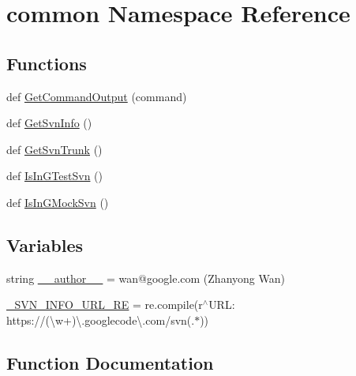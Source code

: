 \hypertarget{namespacecommon}{}\section{common Namespace Reference}
\label{namespacecommon}
\subsection*{Functions}
\begin{DoxyCompactItemize}
\item 
def \hyperlink{namespacecommon_ac1337758ae23f6a91b44de07408791da}{Get\+Command\+Output} (command)
\item 
def \hyperlink{namespacecommon_a312d07161b76d965fee6a61e464e283f}{Get\+Svn\+Info} ()
\item 
def \hyperlink{namespacecommon_a9e6483972a8dc0a6a274cbcee69564b0}{Get\+Svn\+Trunk} ()
\item 
def \hyperlink{namespacecommon_af29dcab2d7b4a9dd846446a0987ab387}{Is\+In\+G\+Test\+Svn} ()
\item 
def \hyperlink{namespacecommon_a8219bb529336fc3f0ef8222a5ed48222}{Is\+In\+G\+Mock\+Svn} ()
\end{DoxyCompactItemize}
\subsection*{Variables}
\begin{DoxyCompactItemize}
\item 
string \hyperlink{namespacecommon_ac0f2c8f2583f0817f09a3e0c6022d707}{\+\_\+\+\_\+author\+\_\+\+\_\+} = \textquotesingle{}wan@google.\+com (Zhanyong Wan)\textquotesingle{}
\item 
\hyperlink{namespacecommon_a8441f667816bce34e6100f88a9ea7dfa}{\+\_\+\+S\+V\+N\+\_\+\+I\+N\+F\+O\+\_\+\+U\+R\+L\+\_\+\+RE} = re.\+compile(r\textquotesingle{}$^\wedge$U\+R\+L\+: https\+://(\textbackslash{}w+)\textbackslash{}.googlecode\textbackslash{}.\+com/svn(.$\ast$)\textquotesingle{})
\end{DoxyCompactItemize}


\subsection{Function Documentation}
\mbox{\label{namespacecommon_ac1337758ae23f6a91b44de07408791da}} 

